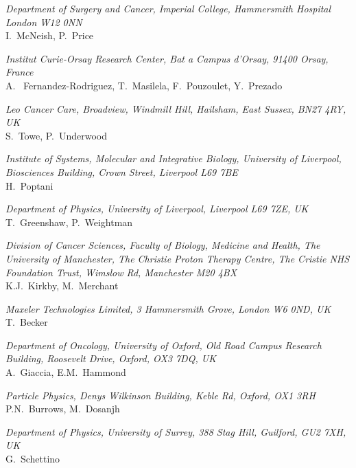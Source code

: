 \vspace{0.5cm}
\noindent \textit{Department of Surgery and Cancer, Imperial College, Hammersmith Hospital London W12 0NN} \\
I.~McNeish, P.~Price
 
\vspace{0.5cm}
\noindent \textit{Institut Curie-Orsay Research Center, Bat a Campus d'Orsay, 91400 Orsay, France} \\
A. ~Fernandez-Rodriguez, T.~Masilela, F.~Pouzoulet, Y.~Prezado
 
\vspace{0.5cm}
\noindent \textit{Leo Cancer Care, Broadview, Windmill Hill, Hailsham, East Sussex, BN27 4RY, UK} \\
S.~Towe, P.~Underwood
 
\vspace{0.5cm}
\noindent \textit{Institute of Systems, Molecular and Integrative Biology, University of Liverpool, Biosciences Building, Crown Street, Liverpool L69 7BE} \\
H.~Poptani
 
\vspace{0.5cm}
\noindent \textit{Department of Physics, University of Liverpool, Liverpool L69 7ZE, UK} \\
T.~Greenshaw, P.~Weightman
 
\vspace{0.5cm}
\noindent \textit{Division of Cancer Sciences, Faculty of Biology, Medicine and Health, The University of Manchester, The Christie Proton Therapy Centre, The Cristie NHS Foundation Trust, Wimslow Rd, Manchester M20 4BX} \\
K.J.~Kirkby, M.~Merchant
 
\vspace{0.5cm}
\noindent \textit{Maxeler Technologies Limited, 3 Hammersmith Grove, London W6 0ND, UK} \\
T.~Becker
 
\vspace{0.5cm}
\noindent \textit{Department of Oncology, University of Oxford, Old Road Campus Research Building, Roosevelt Drive, Oxford, OX3 7DQ, UK} \\
A.~Giaccia, E.M.~Hammond
 
\vspace{0.5cm}
\noindent \textit{Particle Physics, Denys Wilkinson Building, Keble Rd, Oxford, OX1 3RH} \\
P.N.~Burrows, M.~Dosanjh
 
\vspace{0.5cm}
\noindent \textit{Department of Physics, University of Surrey, 388 Stag Hill, Guilford, GU2 7XH, UK} \\
G.~Schettino
 
